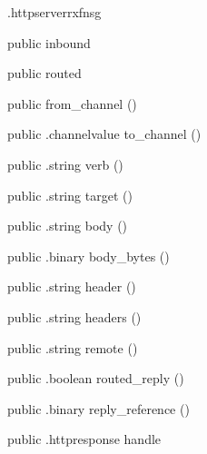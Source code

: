 \begin{CrexxClass}{.httpserver}{rxfnsg}

  \begin{Hierarchy}
  \end{Hierarchy}

  \begin{Members}

    \Factory
      {public}
      {inbound}
      {}

    \Factory
      {public}
      {routed}
      {}

    \Factory
      {public}
      {from\_channel}
      {()}

    \Method
      {public}
      {.channelvalue}
      {to\_channel}
      {()}

    \Method
      {public}
      {.string}
      {verb}
      {()}

    \Method
      {public}
      {.string}
      {target}
      {()}

    \Method
      {public}
      {.string}
      {body}
      {()}

    \Method
      {public}
      {.binary}
      {body\_bytes}
      {()}

    \Method
      {public}
      {.string}
      {header}
      {()}

    \Method
      {public}
      {.string}
      {headers}
      {()}

    \Method
      {public}
      {.string}
      {remote}
      {()}

    \Method
      {public}
      {.boolean}
      {routed\_reply}
      {()}

    \Method
      {public}
      {.binary}
      {reply\_reference}
      {()}

    \Method
      {public}
      {.httpresponse}
      {handle}
      {}


\end{Members}
\end{CrexxClass}
